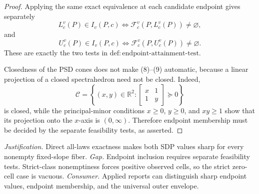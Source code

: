 \documentclass{article}
\begin{document}
\begin{proof}
Applying the same exact equivalence at each candidate endpoint gives separately
\[
 L_c^v(P)\in I_v(P,c)
 \Longleftrightarrow
 \mathcal F_c^v(P,L_c^v(P))\ne\varnothing, \tag{8}
\]
and
\[
 U_c^v(P)\in I_v(P,c)
 \Longleftrightarrow
 \mathcal F_c^v(P,U_c^v(P))\ne\varnothing. \tag{9}
\]
These are exactly the two tests in \(\mathrm{def{:}endpoint\text{-}attainment\text{-}test}\).

Closedness of the PSD cones does not make (8)--(9) automatic, because a linear projection of a closed spectrahedron need not be closed.  Indeed,
\[
 \mathcal C=\left\{(x,y)\in\mathbb R^2:
 \begin{bmatrix}x&1\\1&y\end{bmatrix}\succeq0\right\}
\]
is closed, while the principal-minor conditions \(x\ge0\), \(y\ge0\), and \(xy\ge1\) show that its projection onto the \(x\)-axis is \((0,\infty)\).  Therefore endpoint membership must be decided by the separate feasibility tests, as asserted.
\end{proof}
\par\smallskip\noindent \textit{Justification.} Direct all-laws exactness makes both SDP values sharp for every nonempty fixed-slope fiber. \textit{Gap.} Endpoint inclusion requires separate feasibility tests. Strict-class nonemptiness forces positive observed cells, so the strict zero-cell case is vacuous. \textit{Consumer.} Applied reports can distinguish sharp endpoint values, endpoint membership, and the universal outer envelope.
\end{document}
